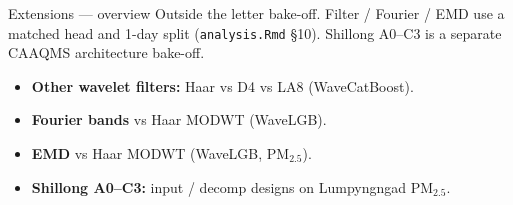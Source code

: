 
\begin{frame}{Extensions --- overview}
  {\footnotesize
  Outside the letter bake-off. Filter / Fourier / EMD use a matched head and
  1-day split (\texttt{analysis.Rmd} §10). Shillong A0--C3 is a separate
  CAAQMS architecture bake-off.
  }
  \vspace{0.35em}
  \begin{itemize}\setlength\itemsep{0.4em}
    \item \textbf{Other wavelet filters:} Haar vs D4 vs LA8 (WaveCatBoost).
    \item \textbf{Fourier bands} vs Haar MODWT (WaveLGB).
    \item \textbf{EMD} vs Haar MODWT (WaveLGB, PM$_{2.5}$).
    \item \textbf{Shillong A0--C3:} input / decomp designs on Lumpyngngad PM$_{2.5}$.
  \end{itemize}
\end{frame}

